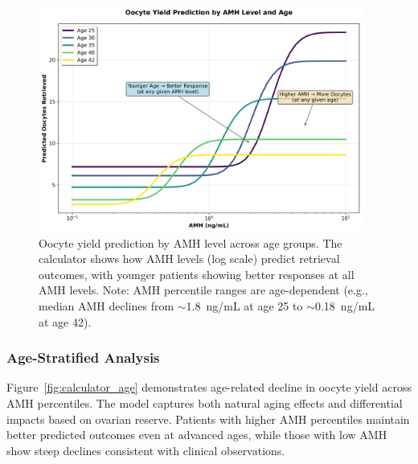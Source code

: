 \begin{figure}[H]
    \centering
    \includegraphics[width=0.95\textwidth]{figures/calculator_amh_oocytes.png}
    \caption{Oocyte yield prediction by AMH level across age groups. The calculator shows how AMH levels (log scale) predict retrieval outcomes, with younger patients showing better responses at all AMH levels. Note: AMH percentile ranges are age-dependent (e.g., median AMH declines from $\sim$1.8~ng/mL at age 25 to $\sim$0.18~ng/mL at age 42).}
    \label{fig:calculator_amh}
\end{figure}

\subsubsection{Age-Stratified Analysis}

Figure~\ref{fig:calculator_age} demonstrates age-related decline in oocyte yield across AMH percentiles. The model captures both natural aging effects and differential impacts based on ovarian reserve. Patients with higher AMH percentiles maintain better predicted outcomes even at advanced ages, while those with low AMH show steep declines consistent with clinical observations.

